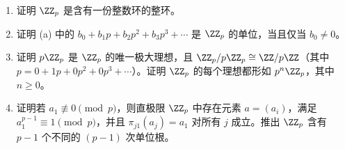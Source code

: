 \begin{enumerate}[label=\arabic*.]
\begin{enumerate}[label=(\alph*)]
\[		\qquad b_i\in\{0,1,\ldots,p-1\}.
		\]
		描述这些形式和在 $\ZZ_p$ 中加法与乘法所对应的规则。\emph{提示：}把每个 $\ZZ/p^i\ZZ$ 中的最小非负剩余写成 $p$ 进展开，再描述映射 $\pi_{ji}$。特别注意 $\ZZ_p$ 是不可数的。
		\item 证明 $\ZZ_p$ 是含有一份整数环的整环。
		\item 证明 (a) 中的 $b_0+b_1p+b_2p^2+b_3p^3+\cdots$ 是 $\ZZ_p$ 的单位，当且仅当 $b_0\neq0$。
		\item 证明 $p\ZZ_p$ 是 $\ZZ_p$ 的唯一极大理想，且 $\ZZ_p/p\ZZ_p\cong\ZZ/p\ZZ$（其中 $p=0+1p+0p^2+0p^3+
		\cdots$）。证明 $\ZZ_p$ 的每个理想都形如 $p^n\ZZ_p$，其中 $n\geq0$。
		\item 证明若 $a_1\not\equiv0\pmod p$，则直极限 $\ZZ_p$ 中存在元素 $a=(a_i)$，满足 $a_1^{p-1}\equiv1\pmod p$，并且 $\pi_{j1}(a_j)=a_1$ 对所有 $j$ 成立。推出 $\ZZ_p$ 含有 $p-1$ 个不同的 $(p-1)$ 次单位根。
	\end{enumerate}
\end{enumerate}

